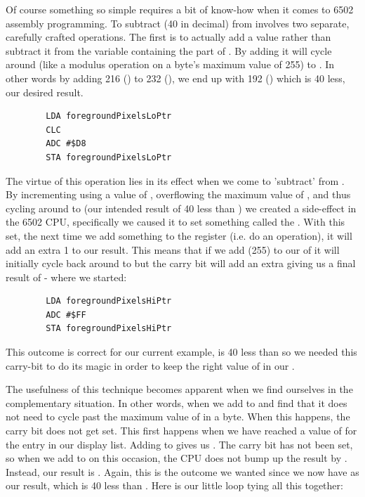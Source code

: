 Of course something so simple requires a bit of know-how when it comes to 6502 assembly programming. To subtract
 (40 in decimal) from  involves two separate, carefully crafted operations. The first
is to actually add a value rather than subtract it from the variable containing the  part of 
. By adding  it will cycle around (like a modulus operation on a byte's maximum value 
of 255) to . In other
words by adding 216 () to 232 (), we end up with 192 () which is 40 less, our
desired result. 
\begin{lstlisting}
        LDA foregroundPixelsLoPtr
        CLC 
        ADC #$D8
        STA foregroundPixelsLoPtr
\end{lstlisting}

The virtue of this operation lies in its effect when we come to 'subtract' from . 
By incrementing using a value of , overflowing the maximum value of , and thus cycling
around to  (our intended result of 40 less than ) we created a
side-effect in the 6502 CPU, specifically we caused it to set something called the . With this
set, the next time we add something to the  register (i.e. do an  operation), it will add
an extra 1 to our result. This means that if we add  (255) to our  of
 it will initially cycle back around to  but the carry bit will add an extra 
giving us a final result of  - where we started:
\begin{lstlisting}
        LDA foregroundPixelsHiPtr
        ADC #$FF
        STA foregroundPixelsHiPtr
\end{lstlisting}

This outcome is correct for our current example,  is 40 less than  so we needed this
carry-bit to do its magic in order to keep the right value of  in our .

The usefulness of this technique becomes apparent when we find ourselves in the complementary situation. In other
words, when we add  to  and find that it does not need to cycle past
the maximum value of  in a byte. When this happens, the carry bit does not get set. This first happens
when we have reached a value of  for the entry in our display list. Adding  to 
gives us . The carry bit has not been set, so when we add  to  on this occasion,
the CPU does not bump up the result by . Instead, our result is . Again, this is the outcome
we wanted since we now have  as our result, which is 40 less than . Here is our little
loop tying all this together:

